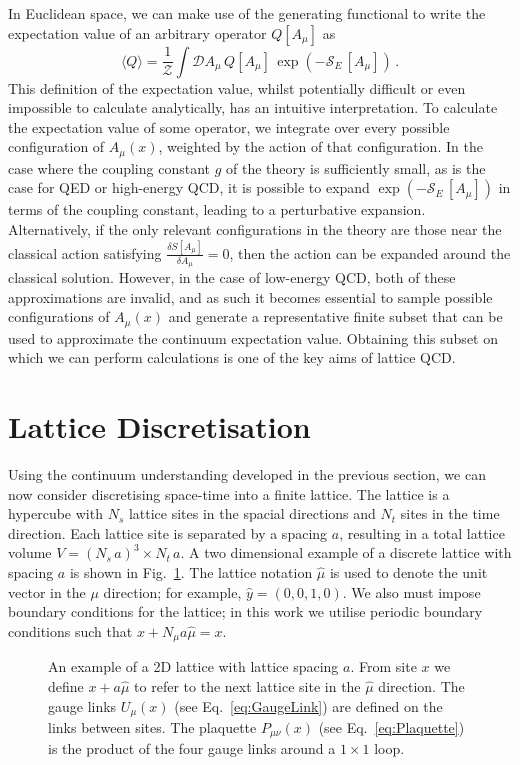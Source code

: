 In Euclidean space, we can make use of the generating functional to write the expectation value of an arbitrary operator $Q[A_\mu]$ as~\cite{Luscher:1984xn}
%
\begin{equation}
\langle Q \rangle = \frac{1}{\mathcal{Z}}\int \mathcal{D} A_\mu\, Q[A_\mu]\, \exp\left(-\mathcal{S}_E\,[A_\mu]\right)\, .
\end{equation}
%
This definition of the expectation value, whilst potentially difficult or even impossible to calculate analytically, has an intuitive interpretation. To calculate the expectation value of some operator, we integrate over every possible configuration of $A_\mu(x)$, weighted by the action of that configuration. In the case where the coupling constant $g$ of the theory is sufficiently small, as is the case for QED or high-energy QCD, it is possible to expand $\exp\left(-\mathcal{S}_E\,[A_\mu]\right)$ in terms of the coupling constant, leading to a perturbative expansion. Alternatively, if the only relevant configurations in the theory are those near the classical action satisfying $\frac{\delta S[A_\mu]}{\delta A_\mu}=0$, then the action can be expanded around the classical solution. However, in the case of low-energy QCD, both of these approximations are invalid, and as such it becomes essential to sample possible configurations of $A_\mu(x)$ and generate a representative finite subset that can be used to approximate the continuum expectation value. Obtaining this subset on which we can perform calculations is one of the key aims of lattice QCD.

\section{Lattice Discretisation}\label{sec:LatticeDiscretisation}
Using the continuum understanding developed in the previous section, we can now consider discretising space-time into a finite lattice. The lattice is a hypercube with $N_s$ lattice sites in the spacial directions and $N_t$ sites in the time direction. Each lattice site is separated by a spacing $a$, resulting in a total lattice volume $V=(N_s\,a)^3\times N_t\,a$. A two dimensional example of a discrete lattice with spacing $a$ is shown in Fig.~\ref{fig:LatticeExample}. The lattice notation $\hat{\mu}$ is used to denote the unit vector in the $\mu$ direction; for example, $\hat{y} = (0,0,1,0)$. We also must impose boundary conditions for the lattice; in this work we utilise periodic boundary conditions such that $x+N_\mu a\hat{\mu}=x$.\\
%
\begin{figure}[ht]
\centering

\caption[An example of a 2D lattice with lattice spacing $a$.]{\label{fig:LatticeExample} An example of a 2D lattice with lattice spacing $a$. From site $x$ we define $x+a\hat{\mu}$ to refer to the next lattice site in the $\hat{\mu}$ direction. The gauge links $U_\mu(x)$ (see Eq.~\eqref{eq:GaugeLink}) are defined on the links between sites. The plaquette $P_{\mu\nu}(x)$ (see Eq.~\eqref{eq:Plaquette}) is the product of the four gauge links around a $1\times 1$ loop.}
\end{figure}
%

